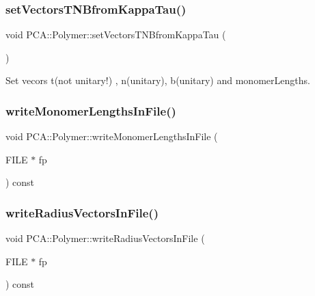 \hypertarget{class_p_c_a_1_1_polymer_a55787461ed50776c48819a5cc3911c38}{}\label{class_p_c_a_1_1_polymer_a55787461ed50776c48819a5cc3911c38} 
\subsubsection{\texorpdfstring{set\+Vectors\+T\+N\+Bfrom\+Kappa\+Tau()}{setVectorsTNBfromKappaTau()}}
{\footnotesize\ttfamily void P\+C\+A\+::\+Polymer\+::set\+Vectors\+T\+N\+Bfrom\+Kappa\+Tau (\begin{DoxyParamCaption}{ }\end{DoxyParamCaption})}



Set vecors t(not unitary!) , n(unitary), b(unitary) and monomer\+Lengths. 

\hypertarget{class_p_c_a_1_1_polymer_a081b8e4d7cac0da6cc411c7b56ff7362}{}\label{class_p_c_a_1_1_polymer_a081b8e4d7cac0da6cc411c7b56ff7362} 
\subsubsection{\texorpdfstring{write\+Monomer\+Lengths\+In\+File()}{writeMonomerLengthsInFile()}}
{\footnotesize\ttfamily void P\+C\+A\+::\+Polymer\+::write\+Monomer\+Lengths\+In\+File (\begin{DoxyParamCaption}\item[{F\+I\+LE $\ast$}]{fp }\end{DoxyParamCaption}) const}

\hypertarget{class_p_c_a_1_1_polymer_a9859e587476da47e49cfee1152e93fa0}{}\label{class_p_c_a_1_1_polymer_a9859e587476da47e49cfee1152e93fa0} 
\subsubsection{\texorpdfstring{write\+Radius\+Vectors\+In\+File()}{writeRadiusVectorsInFile()}}
{\footnotesize\ttfamily void P\+C\+A\+::\+Polymer\+::write\+Radius\+Vectors\+In\+File (\begin{DoxyParamCaption}\item[{F\+I\+LE $\ast$}]{fp }\end{DoxyParamCaption}) const}

